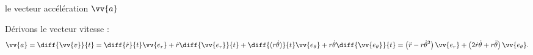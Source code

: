 \begin{enonce}
	 le vecteur accélération $\vv{a}$ 		
\end{enonce}


\begin{corrige}
Dérivons le vecteur vitesse : 
\[
\vv{a}=\diff{\vv{v}}{t}=\diff{\dot{r}}{t} \vv{e_r} +\dot{r} \diff{\vv{e_r}}{t} + \diff{(r\dot{\theta})}{t} \vv{e_\theta}+r\dot{\theta} \diff{\vv{e_\theta}}{t}=\left( \ddot{r} - r \dot{\theta}^2\right) \vv{e_r} + \left( 2\dot{r}\dot{\theta} + r \ddot{\theta} \right) \vv{e_\theta}.
\]
\end{corrige}

\finEntrainement













\hauteurLargeurCadreReponse		{6mm}{3cm}
\initialisationEntrainement




